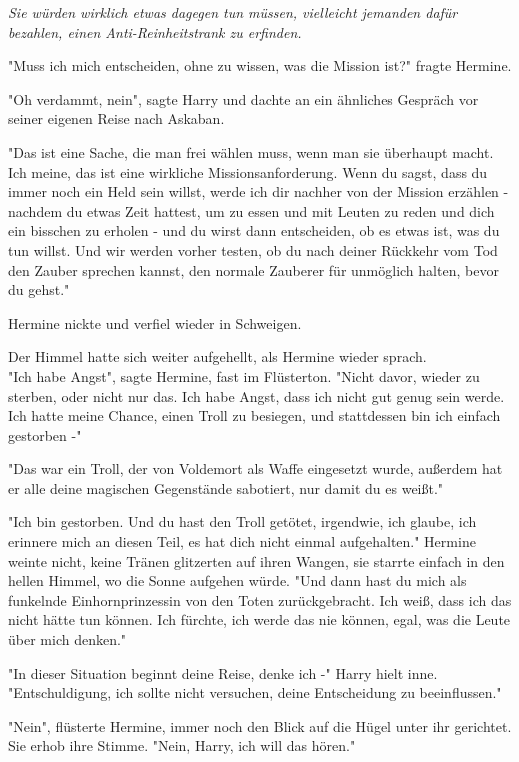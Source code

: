 {\emph{Sie würden wirklich etwas dagegen tun müssen, vielleicht jemanden dafür bezahlen, einen Anti-Reinheitstrank zu erfinden.}

"Muss ich mich entscheiden, ohne zu wissen, was die Mission ist?" fragte Hermine.

"Oh verdammt, nein", sagte Harry und dachte an ein ähnliches Gespräch vor seiner eigenen Reise nach Askaban.

"Das ist eine Sache, die man frei wählen muss, wenn man sie überhaupt macht. Ich meine, das ist eine wirkliche Missionsanforderung. Wenn du sagst, dass du immer noch ein Held sein willst, werde ich dir nachher von der Mission erzählen - nachdem du etwas Zeit hattest, um zu essen und mit Leuten zu reden und dich ein bisschen zu erholen - und du wirst dann entscheiden, ob es etwas ist, was du tun willst. Und wir werden vorher testen, ob du nach deiner Rückkehr vom Tod den Zauber sprechen kannst, den normale Zauberer für unmöglich halten, bevor du gehst."

Hermine nickte und verfiel wieder in Schweigen.

Der Himmel hatte sich weiter aufgehellt, als Hermine wieder sprach.\\ "Ich habe Angst", sagte Hermine, fast im Flüsterton. "Nicht davor, wieder zu sterben, oder nicht nur das. Ich habe Angst, dass ich nicht gut genug sein werde. Ich hatte meine Chance, einen Troll zu besiegen, und stattdessen bin ich einfach gestorben -"

"Das war ein Troll, der von Voldemort als Waffe eingesetzt wurde, außerdem hat er alle deine magischen Gegenstände sabotiert, nur damit du es weißt."

"Ich bin gestorben. Und du hast den Troll getötet, irgendwie, ich glaube, ich erinnere mich an diesen Teil, es hat dich nicht einmal aufgehalten." Hermine weinte nicht, keine Tränen glitzerten auf ihren Wangen, sie starrte einfach in den hellen Himmel, wo die Sonne aufgehen würde. "Und dann hast du mich als funkelnde Einhornprinzessin von den Toten zurückgebracht. Ich weiß, dass ich das nicht hätte tun können. Ich fürchte, ich werde das nie können, egal, was die Leute über mich denken."

"In dieser Situation beginnt deine Reise, denke ich -" Harry hielt inne. "Entschuldigung, ich sollte nicht versuchen, deine Entscheidung zu beeinflussen."

"Nein", flüsterte Hermine, immer noch den Blick auf die Hügel unter ihr gerichtet. Sie erhob ihre Stimme. "Nein, Harry, ich will das hören."

}

